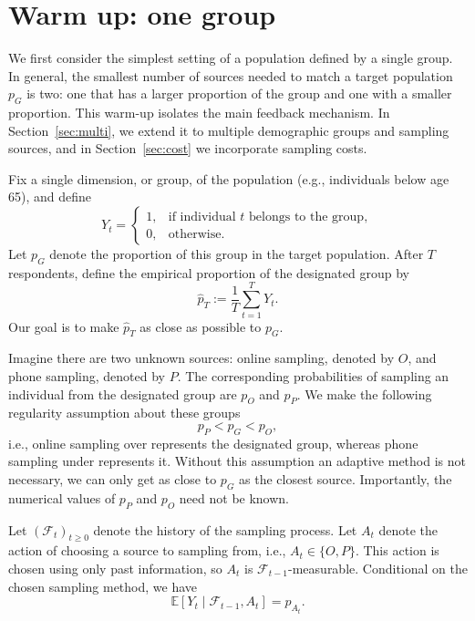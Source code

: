 \documentclass[twoside]{article}
\begin{document}
\section{Warm up: one group}
\label{sec:two-source}
We first consider the simplest setting of a population defined by a single group. In general, the smallest number of sources needed to match a target population $p_G$ is two: one that has a larger proportion of the group and one with a smaller proportion. This warm-up isolates the main feedback mechanism. In Section~\ref{sec:multi}, we extend it to multiple demographic groups and sampling sources, and in Section~\ref{sec:cost} we incorporate  sampling costs.

Fix a single dimension, or group, of the population (e.g., individuals below age 65), and define
\[
Y_t =
\begin{cases}
1, & \text{if individual $t$ belongs to the group},\\
0, & \text{otherwise}.
\end{cases}
\]
Let \(p_G\) denote the proportion of this group in the target population.
After \(T\) respondents, define the empirical proportion of the designated
group by
\begin{equation}
\label{phat}
\widehat p_T
:=
\frac{1}{T}\sum_{t=1}^T Y_t.
\end{equation}
Our goal is to make \(\widehat p_T\) as close as possible to \(p_G\).

Imagine there are two unknown sources: online sampling, denoted by \(O\), and phone sampling, denoted by \(P\). The corresponding probabilities of sampling an individual from the designated group are \(p_O\) and \(p_P\). We make the  following regularity assumption about these groups
\[
p_P < p_G < p_O,
\]
i.e., online sampling over represents the designated group, whereas phone sampling under represents it. Without this assumption an adaptive method is not necessary, we can only get as close to $p_G$ as the closest source. Importantly, the numerical values of \(p_P\) and \(p_O\) need not be known.

Let \((\mathcal F_t)_{t\geq0}\) denote the history of the sampling process. Let \(A_t\) denote the action of choosing a source to sampling from, i.e., $A_t \in \{O,P\}$. This action is chosen using only past information, so
\(A_t\) is \(\mathcal F_{t-1}\)-measurable. Conditional on the chosen sampling method, we have
\[
\mathbb E[Y_t\mid \mathcal F_{t-1}, A_t]
=
p_{A_t}.
\]
\end{document}
